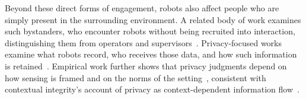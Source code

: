   Beyond these direct forms of engagement, robots also affect people who are simply present in the surrounding environment. A related body of work examines such bystanders, who encounter robots without being recruited into interaction, distinguishing them from operators and supervisors~\cite{scholtz2003theory}. Privacy-focused works examine what robots record, who receives those data, and how such information is retained~\cite{rueben2018themes, lutz2019privacy, dietrich2026bystander}. Empirical work further shows that privacy judgments depend on how sensing is framed and on the norms of the setting~\cite{butler2015privacy, denning2014insitu}, consistent with contextual integrity's account of privacy as context-dependent information flow~\cite{nissenbaum2010privacy}.
  
  
  
  

